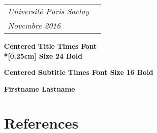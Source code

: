 \documentclass[a4paper,oneside]{bth}
\begin{document}
\pagestyle{plain}


{\pagestyle{empty}
\changepage{5cm}{1cm}{-0.5cm}{-0.5cm}{}{-2cm}{}{}{}
\noindent%
{\small
\begin{tabular}{p{} p{}}
\textit{Université Paris Saclay}\\
\textit{Novembre 2016}\\
\end{tabular}}

\begin{center}

\par\vspace {7cm}

{\Huge\textbf{Centered Title Times Font\\*[0.25cm] Size 24 Bold}}   

\par\vspace {0.5cm}

{\Large\textbf{Centered Subtitle Times Font Size 16 Bold}}                   

\par\vspace {3cm}

{\Large\textbf{Firstname Lastname}}
\par\vspace {7cm}

\end{center}


\clearpage
}


\par\vspace {12cm}


\setcounter{page}{1}




\tableofcontents 

\cleardoublepage
\pagestyle{headings}







	
	
	
	
	




\chapter*{References}
\end{document}
